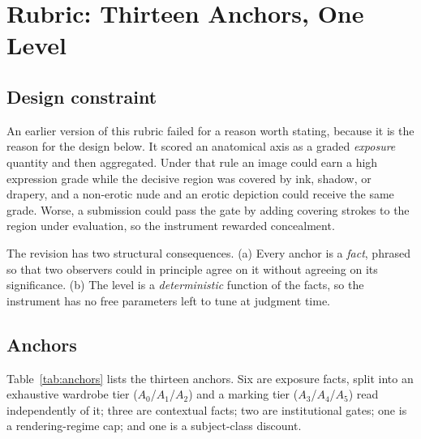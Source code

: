 \documentclass[11pt]{article}
\begin{document}
\section{Rubric: Thirteen Anchors, One Level}
\label{sec:rubric}
\subsection{Design constraint}
An earlier version of this rubric failed for a reason worth stating, because it is the reason for the design below. It scored an anatomical axis as a graded \emph{exposure} quantity and then aggregated. Under that rule an image could earn a high expression grade while the decisive region was covered by ink, shadow, or drapery, and a non-erotic nude and an erotic depiction could receive the same grade. Worse, a submission could pass the gate by adding covering strokes to the region under evaluation, so the instrument rewarded concealment.

The revision has two structural consequences. (a) Every anchor is a \emph{fact}, phrased so that two observers could in principle agree on it without agreeing on its significance. (b) The level is a \emph{deterministic} function of the facts, so the instrument has no free parameters left to tune at judgment time.

\subsection{Anchors}
Table~\ref{tab:anchors} lists the thirteen anchors. Six are exposure facts, split into an exhaustive wardrobe tier ($A_0$/$A_1$/$A_2$) and a marking tier ($A_3$/$A_4$/$A_5$) read independently of it; three are contextual facts; two are institutional gates; one is a rendering-regime cap; and one is a subject-class discount.
\end{document}
